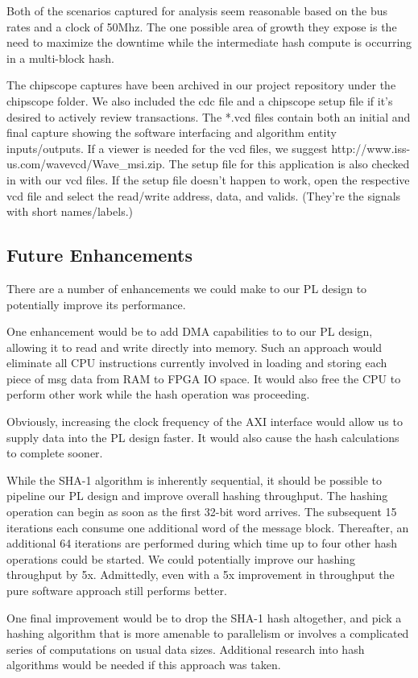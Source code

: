 \documentclass[journal]{IEEEtran}
\begin{document}
Both of the scenarios captured for analysis seem reasonable based on the bus rates and a clock of 50Mhz.  The one possible area of growth they expose is the need to maximize the downtime while the intermediate hash compute is occurring in a multi-block hash.

The chipscope captures have been archived in our project repository under the chipscope folder.  We also included the cdc file and a chipscope setup file if it’s desired to actively review transactions.  The *.vcd files contain both an initial and final capture showing the software interfacing and algorithm entity inputs/outputs.  If a viewer is needed for the vcd files, we suggest http://www.iss-us.com/wavevcd/Wave\_msi.zip.  The setup file for this application is also checked in with our vcd files.  If the setup file doesn't happen to work, open the respective vcd file and select the read/write address, data, and valids.  (They’re the signals with short names/labels.)
\subsection{Future Enhancements}
There are a number of enhancements we could make to our PL design to potentially improve its performance.

One enhancement would be to add DMA capabilities to to our PL design, allowing it to read and write directly into memory.  Such an approach would eliminate all CPU instructions currently involved in loading and storing each piece of msg data from RAM to FPGA IO space.  It would also free the CPU to perform other work while the hash operation was proceeding.

Obviously, increasing the clock frequency of the AXI interface would allow us to supply data into the PL design faster.  It would also cause the hash calculations to complete sooner.

While the SHA-1 algorithm is inherently sequential, it should be possible to pipeline our PL design and improve overall hashing throughput.  The hashing operation can begin as soon as the first 32-bit word arrives.  The subsequent 15 iterations each consume one additional word of the message block.  Thereafter, an additional 64 iterations are performed during which time up to four other hash operations could be started.  We could potentially improve our hashing throughput by 5x.  Admittedly, even with a 5x improvement in throughput the pure software approach still performs better.

One final improvement would be to drop the SHA-1 hash altogether, and pick a hashing algorithm that is more amenable to parallelism or involves a complicated series of computations on usual data sizes.  Additional research into hash algorithms would be needed if this approach was taken.
\end{document}
